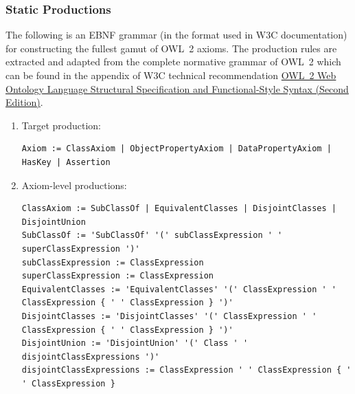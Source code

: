 \documentclass[a4paper]{article}
\newcounter{ex}
\begin{document}
\subsubsection{Static Productions}

The following is an EBNF grammar (in the format used in W3C documentation)
for constructing the fullest gamut of OWL~2 axioms.
The production rules are extracted and adapted from the complete normative grammar
of OWL~2 which can be found in the appendix of W3C technical recommendation
\href{http://www.w3.org/TR/2012/REC-owl2-syntax-20121211/}{OWL~2 Web Ontology Language
Structural Specification and Functional-Style Syntax (Second Edition)}.
\begin{enumerate}
\item Target production:
{\small
\begin{verbatim}
Axiom := ClassAxiom | ObjectPropertyAxiom | DataPropertyAxiom | HasKey | Assertion
\end{verbatim}
}
\item Axiom-level productions:
{\scriptsize
\begin{verbatim}
ClassAxiom := SubClassOf | EquivalentClasses | DisjointClasses | DisjointUnion
SubClassOf := 'SubClassOf' '(' subClassExpression ' ' superClassExpression ')'
subClassExpression := ClassExpression
superClassExpression := ClassExpression
EquivalentClasses := 'EquivalentClasses' '(' ClassExpression ' ' ClassExpression { ' ' ClassExpression } ')'
DisjointClasses := 'DisjointClasses' '(' ClassExpression ' ' ClassExpression { ' ' ClassExpression } ')'
DisjointUnion := 'DisjointUnion' '(' Class ' ' disjointClassExpressions ')'
disjointClassExpressions := ClassExpression ' ' ClassExpression { ' ' ClassExpression }


\end{verbatim}}
\end{enumerate}
\end{document}

